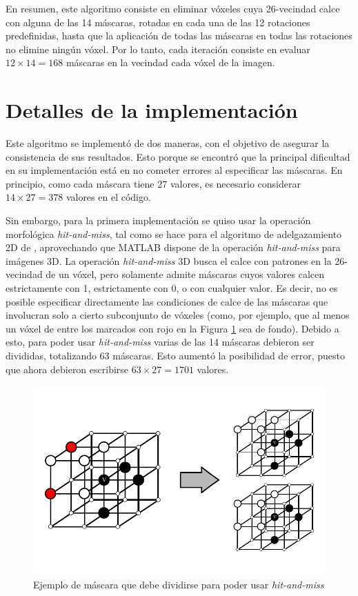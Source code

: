 En resumen, este algoritmo consiste en eliminar vóxeles cuya 26-vecindad calce con alguna de las 14 máscaras, rotadas en cada una de las 12 rotaciones predefinidas, hasta que la aplicación de todas las máscaras en todas las rotaciones no elimine ningún vóxel. Por lo tanto, cada iteración consiste en evaluar $12 \times 14 = 168$ máscaras en la vecindad cada vóxel de la imagen.

\section{Detalles de la implementación}

Este algoritmo se implementó de dos maneras, con el objetivo de asegurar la consistencia de sus resultados. Esto porque se encontró que la principal dificultad en su implementación está en no cometer errores al especificar las máscaras. En principio, como cada máscara tiene 27 valores, es necesario considerar $14 \times 27 = 378$ valores en el código.

Sin embargo, para la primera implementación se quiso usar la operación morfológica \textit{hit-and-miss}, tal como se hace para el algoritmo de adelgazamiento 2D de \cite{jain1995machine}, aprovechando que MATLAB dispone de la operación \textit{hit-and-miss} para imágenes 3D. La operación \textit{hit-and-miss} 3D busca el calce con patrones en la 26-vecindad de un vóxel, pero solamente admite máscaras cuyos valores calcen estrictamente con 1, estrictamente con 0, o con cualquier valor. Es decir, no es posible especificar directamente las condiciones de calce de las máscaras que involucran solo a cierto subconjunto de vóxeles (como, por ejemplo, que al menos un vóxel de entre los marcados con rojo en la Figura \ref{fig:palagyi_split} sea de fondo). Debido a esto, para poder usar \textit{hit-and-miss} varias de las 14 máscaras debieron ser divididas, totalizando 63 máscaras. Esto aumentó la posibilidad de error, puesto que ahora debieron escribirse $63 \times 27 = 1701$ valores.

\begin{figure}[H]\centering
\includegraphics[width=0.6\linewidth]{images/palagyi_split}
\caption{Ejemplo de máscara que debe dividirse para poder usar \textit{hit-and-miss}}
\label{fig:palagyi_split}
\end{figure}

